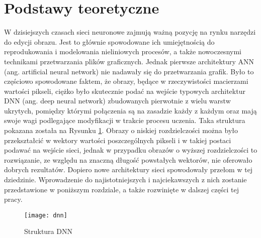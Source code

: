 \section{Podstawy teoretyczne}

  W dzisiejszych czasach sieci neuronowe zajmują ważną pozycję na rynku narzędzi
  do edycji obrazu. Jest to głównie spowodowane ich umiejętnością do
  reprodukowania i modelowania nieliniowych procesów, a także nowoczesnymi
  technikami przetwarzania plików graficznych.
  Jednak pierwsze architektury ANN (ang. artificial neural network) nie nadawały
  się do przetwarzania grafik.
  Było to częściowo spowodowane faktem, że obrazy, będące w rzeczywistości macierzami
  wartości pikseli,
  ciężko było skutecznie podać
  na wejście typowych architektur DNN (ang. deep neural network) zbudowanych
  pierwotnie z wielu warstw ukrytych, pomiędzy którymi połączenia są na zasadzie
  każdy z każdym oraz mają swoje wagi podlegające modyfikacji w trakcie procesu
  uczenia. Taka struktura pokazana została na Rysunku \ref{fig:dnn}.
  Obrazy o niskiej rozdzielczości można było przekształcić w wektory
  wartości poszczególnych pikseli i w takiej postaci podawać na wejście sieci,
  jednak w przypadku obrazów o wyższej rozdzielczości to rozwiązanie, ze
  względu na znaczną długość powstałych wektorów, nie oferowało dobrych
  rezultatów.
  Dopiero nowe architektury sieci spowodowały przełom w tej dziedzinie.
  Wprowadzenie do najistotniejszych i najciekawszych z nich zostanie przedstawione w
  poniższym rozdziale, a także rozwinięte w dalszej części tej pracy.


  \begin{figure}[h]
    \centering
    \texttt{[image: dnn]}
    \caption[Struktura DNN - źródło: \url{https://towardsdatascience.com/building-a-convolutional-neural-network-male-vs-female-50347e2fa88b}]{Struktura DNN}
    \label{fig:dnn}
  \end{figure}


